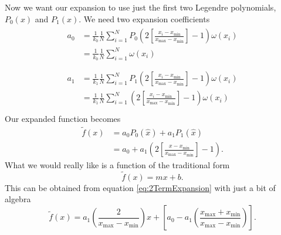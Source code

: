 \documentclass[12pt]{article}
\newcommand{\xmax}{x_{\max}}
\newcommand{\xmin}{x_{\min}}
\newcommand{\xg}{2\left[ \frac{x-\xmin}{\xmax - \xmin} \right] - 1}
\begin{document}
Now we want our expansion to use just the first two Legendre polynomials, $P_0(x)$ and $P_1(x)$.  We need two expansion coefficients
\begin{subequations}
    \begin{align}
        \begin{split}
            a_0 &= \frac{1}{k_0}\frac{1}{N}\sum_{i=1}^N P_0\!\left( 2\left[\frac{x_i-\xmin}{\xmax-\xmin}\right]-1 \right)\omega(x_i) \\
             &=  \frac{1}{k_0}\frac{1}{N}\sum_{i=1}^N \omega(x_i) \\
        \end{split}\\
        \begin{split}
            a_1 &= \frac{1}{k_1}\frac{1}{N}\sum_{i=1}^N P_1\!\left( 2\left[\frac{x_i-\xmin}{\xmax-\xmin}\right]-1 \right)\omega(x_i) \\
             &= \frac{1}{k_1}\frac{1}{N}\sum_{i=1}^N  \left( 2\left[\frac{x_i-\xmin}{\xmax-\xmin}\right]-1 \right)\omega(x_i)\\
        \end{split}
    \end{align}
\end{subequations}
Our expanded function becomes
\begin{equation}
    \begin{split}
        \tilde{f}(x) &= a_0P_0\left(\hat{x}\right) + a_1P_1\left(\hat{x}\right) \\
         &= a_0 + a_1\left( \xg \right).
    \end{split}
    \label{eq:2TermExpansion}
\end{equation}
What we would really like is a function of the traditional form \[ \tilde{f}(x) = mx+b.\]  This can be obtained from equation \eqref{eq:2TermExpansion} with just a bit of algebra
\begin{equation}
    \tilde{f}(x) = a_1\left(\frac{2}{\xmax-\xmin}\right)x + \left[a_0 - a_1\left(\frac{\xmax+\xmin}{\xmax-\xmin}\right)\right].
    \label{eq:2TermPointSlope}
\end{equation}
\end{document}
